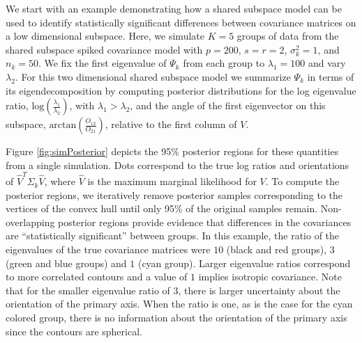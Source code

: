 \documentclass{statsoc}
\begin{document}

We start with an example demonstrating how a shared subspace
model can be used to identify statistically significant differences between
covariance matrices on a low dimensional subspace. Here, we simulate
$K=5$ groups of data from the shared subspace spiked covariance
model with $p=200$, $s=r=2$, $\sigma_k^2=1$, and
$n_k=50$.  We fix the first eigenvalue of $\Psi_k$ from each group to
$\lambda_1=100$ and vary $\lambda_2$.  For this two dimensional shared subspace
model we summarize $\Psi_k$ in terms of its eigendecomposition by
computing posterior distributions for the log eigenvalue ratio,
$\text{log}(\frac{\lambda_1}{\lambda_2})$, with $\lambda_1 > \lambda_2$, and the
angle of the first eigenvector on this subspace,
$\text{arctan}(\frac{O_{12}}{O_{21}})$, relative to the first column
of $V$.

Figure \ref{fig:simPosterior} depicts the 95\% posterior regions for
these quantities from a single simulation.  Dots correspond to the
true log ratios and orientations of $\hat{V}^T\Sigma_k\hat{V}$, where
$\hat{V}$ is the maximum marginal likelihood for $V$. To compute the
posterior regions, we iteratively remove posterior samples
corresponding to the vertices of the convex hull until only 95\% of
the original samples remain.  Non-overlapping posterior regions
provide evidence that differences in the covariances are
``statistically significant'' between groups.  In this example, the
ratio of the eigenvalues of the true covariance matrices were $10$
(black and red groups), $3$ (green and blue groups) and $1$ (cyan
group).  Larger eigenvalue ratios correspond to more correlated
contours and a value of $1$ implies isotropic covariance.  Note that
for the smaller eigenvalue ratio of $3$, there is larger uncertainty
about the orientation of the primary axis.  When the ratio is one, as
is the case for the cyan colored group, there is no information about
the orientation of the primary axis since the contours are spherical.
\end{document}
